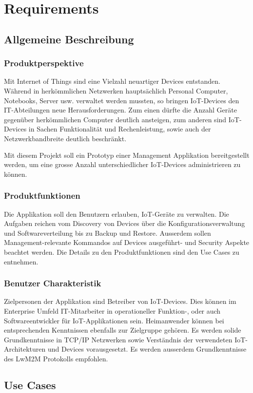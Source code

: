 \chapter{Requirements}
\section{Allgemeine Beschreibung}
\subsection{Produktperspektive}
Mit Internet of Things sind eine Vielzahl neuartiger Devices entstanden. Während in herkömmlichen Netzwerken hauptsächlich Personal Computer, Notebooks, Server usw. verwaltet werden mussten, so bringen IoT-Devices den IT-Abteilungen neue Herausforderungen. Zum einen dürfte die Anzahl Geräte gegenüber herkömmlichen Computer deutlich ansteigen, zum anderen sind IoT-Devices in Sachen Funktionalität und Rechenleistung, sowie auch der Netzwerkbandbreite deutlich beschränkt. 

Mit diesem Projekt soll ein Prototyp einer Management Applikation bereitgestellt werden, um eine grosse Anzahl unterschiedlicher IoT-Devices administrieren zu können. 
\subsection{Produktfunktionen}
Die Applikation soll den Benutzern erlauben, IoT-Geräte zu verwalten. Die Aufgaben reichen vom Discovery von Devices über die Konfigurationsverwaltung und Softwareverteilung bis zu Backup und Restore. Ausserdem sollen Management-relevante Kommandos auf Devices ausgeführt- und Security Aspekte beachtet werden. Die Details zu den Produktfunktionen sind den Use Cases zu entnehmen.

\subsection{Benutzer Charakteristik}
\label{sec:benutzercharakteristik}
Zielpersonen der Applikation sind Betreiber von IoT-Devices. Dies können im Enterprise Umfeld IT-Mitarbeiter in operationeller Funktion-, oder auch Softwareentwickler für IoT-Applikationen sein. Heimanwender können bei entsprechenden Kenntnissen ebenfalls zur Zielgruppe gehören. Es werden solide Grundkenntnisse in TCP/IP Netzwerken sowie Verständnis der verwendeten IoT-Architekturen und Devices vorausgesetzt. Es werden ausserdem Grundkenntnisse des LwM2M Protokolls empfohlen. 
\section{Use Cases}
\label{sec:usecases}
